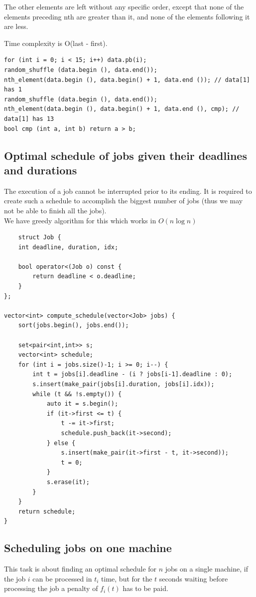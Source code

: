 \documentclass[8pt, a4paper, oneside, twocolumn]{extarticle}
\begin{document}
The other elements are left without any specific order, except that none of the elements preceding nth are greater than it, and none of the elements following it are less.

Time complexity is O(last - first).
\begin{verbatim}
for (int i = 0; i < 15; i++) data.pb(i);
random_shuffle (data.begin (), data.end());
nth_element(data.begin (), data.begin() + 1, data.end ()); // data[1] has 1
random_shuffle (data.begin (), data.end());
nth_element(data.begin (), data.begin() + 1, data.end (), cmp); // data[1] has 13
bool cmp (int a, int b) return a > b;
\end{verbatim}
\subsection{Optimal schedule of jobs given their deadlines and durations}
The execution of a job cannot be interrupted prior to its ending. It is required to create such a schedule to accomplish the biggest number of jobs (thus we may not be able to finish all the jobs).\\We have greedy algorithm for this which works in $O(n \log n)$
\begin{verbatim}
    struct Job {
    int deadline, duration, idx;

    bool operator<(Job o) const {
        return deadline < o.deadline;
    }
};

vector<int> compute_schedule(vector<Job> jobs) {
    sort(jobs.begin(), jobs.end());

    set<pair<int,int>> s;
    vector<int> schedule;
    for (int i = jobs.size()-1; i >= 0; i--) {
        int t = jobs[i].deadline - (i ? jobs[i-1].deadline : 0);
        s.insert(make_pair(jobs[i].duration, jobs[i].idx));
        while (t && !s.empty()) {
            auto it = s.begin();
            if (it->first <= t) {
                t -= it->first;
                schedule.push_back(it->second);
            } else {
                s.insert(make_pair(it->first - t, it->second));
                t = 0;
            }
            s.erase(it);
        }
    }
    return schedule;
}
\end{verbatim}
\subsection{Scheduling jobs on one machine}

This task is about finding an optimal schedule for $n$ jobs on a single machine, if the job $i$ can be processed in $t_i$ time, but for the $t$ seconds waiting before processing the job a penalty of $f_i(t)$ has to be paid.
\end{document}
